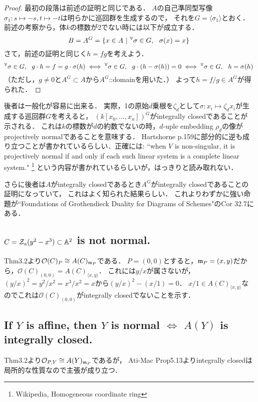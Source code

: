 \documentclass[a4paper]{jsarticle}
\begin{document}
    \begin{proof}
        最初の段落は前述の証明と同じである．
        $A$の自己準同型写像$\sigma_1: s \mapsto -s, t \mapsto -t$は明らかに巡回群を生成するので，
        それを$G=\langle \sigma_1 \rangle$とおく．
        前述の考察から，体$k$の標数が2でない時には以下が成立する．
        \[ B=A^G=\{x \in A ~|~ {}^{\forall} \sigma \in G,~~ \sigma(x)=x \} \]
        さて，前述の証明と同じく$h=fg$を考えよう．
        \[
            {}^{\forall} \sigma \in G,~~ g \cdot h=f=g \cdot \sigma(h)
            \iff {}^{\forall} \sigma \in G,~~ g \cdot (h-\sigma(h))=0
            \iff {}^{\forall} \sigma \in G,~~ h=\sigma(h)
        \]
        （ただし，$g \neq 0$と$A^G \subset A$から$A^G$::domainを用いた．）
        よって$h=f/g \in A^G$が得られた．
    \end{proof}
    後者は一般化が容易に出来る．
    実際，1の原始$d$乗根を$\zeta_d$として$\sigma: x_i \mapsto \zeta_d x_i$が生成する巡回群$G$を考えると，
    $(k[x_0,\dots,x_n])^G$がintegrally closedであることが示される．
    これは$k$の標数が$d$の約数でないの時，$d$-uple embedding $\rho_d$の像がprojectively normalであることを意味する．
    Hartshorne p.159に部分的に逆も成り立つことが書かれているらしい．正確には:
    ``when $V$ is non-singular, it is projectively normal if and only if each such linear system is a complete linear system."
    \footnote{Wikipedia, Homogeneous coordinate ring}
    という内容が書かれているらしいが，はっきりと読み取れない．

    さらに後者は$A$がintegrally closedであるとき$A^G$がintegrally closedであることの証明になっていて，
    これはよく知られた結果らしい．
    これよりわずかに強い命題が``Foundations of Grothendieck Duality for Diagrams of Schemes"のCor 32.7にある．

    \subsection{$C=\mathcal{Z}_a(y^2-x^3) \subset \mathbb{A}^2$ is not normal.}
    Thm3.2より$\mathcal{O}(C)_P \cong A(C)_{\mathfrak{m}_P}$である．
    $P=(0,0)$とすると，$\mathfrak{m}_P=(x,y)$だから，$\mathcal{O}(C)_{(0,0)}=A(C)_{\langle x,y \rangle}$．
    これには$y/x$が属さないが，$(y/x)^2=y^2/x^2=x^3/x^2=x$から$(y/x)^2-(x/1)=0$．
    $x/1 \in A(C)_{\langle x,y \rangle}$なのでこれは$\mathcal{O}(C)_{(0,0)}$がintegrally closedでないことを示す．

    \subsection{If $Y$ is affine, then $Y$ is normal $\iff$ $A(Y)$ is integrally closed.}
    Thm3.2より$\mathcal{O}_{P,Y} \cong A(Y)_{\mathfrak{m}_P}$であるが，
    Ati-Mac Prop5.13よりintegrally closedは局所的な性質なので主張が成り立つ．
\end{document}
